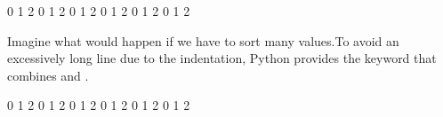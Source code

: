 \documentclass[letterpaper,10pt,english]{sphinxmanual}
\begin{document}
\begin{sphinxVerbatim}[commandchars=\\\{\}]
\end{sphinxVerbatim}

\begin{sphinxVerbatim}[commandchars=\\\{\}]
0 1 2
0 1 2
0 1 2
0 1 2
0 1 2
0 1 2
\end{sphinxVerbatim}

Imagine what would happen if we have to sort many values.To avoid an excessively long line due to the indentation, Python provides the  keyword that combines  and .

\begin{sphinxVerbatim}[commandchars=\\\{\}]
   
         
          
         
          
         
          
         
          
         
          
          


\end{sphinxVerbatim}

\begin{sphinxVerbatim}[commandchars=\\\{\}]
0 1 2
0 1 2
0 1 2
0 1 2
0 1 2
0 1 2
\end{sphinxVerbatim}
\end{document}
